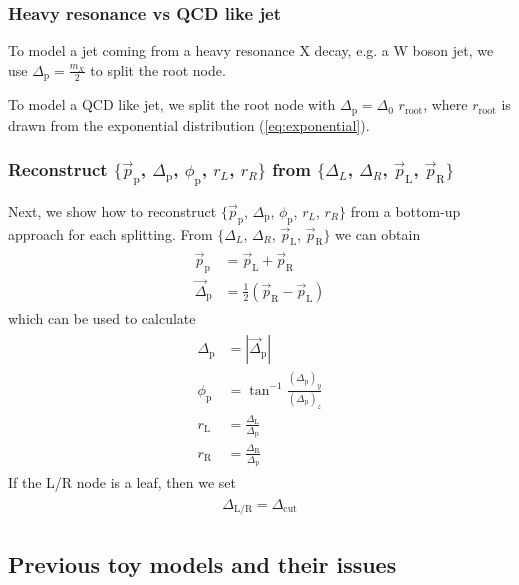 \documentclass[12pt]{article}
\newcommand{\bea}{\begin{eqnarray}\begin{aligned}}
\newcommand{\eea}{\end{aligned}\end{eqnarray}}
\begin{document}
\subsubsection{Heavy resonance vs QCD like jet}\label{Heavy resonance vs QCD like jet}

To model a jet coming from a heavy resonance X decay, e.g. a W boson jet, we use $\Delta_{\text{p}} =  \frac{m_X}{2}$ to split the root node.

To model a QCD like jet, we split the root node with $\Delta_{\text{p}} = \Delta_0 \,\, r_{\text{root}}$, where $r_{\text{root}}$ is drawn from the exponential distribution (\ref{eq:exponential}).

\subsubsection{Reconstruct $\{\vec{p}_\text{p}$, $\Delta_{\text{p}}$, $\phi_{\text{p}}$, $r_L$, $r_R\}$ from  $\{\Delta_L$, $\Delta_R$, $\vec{p}_\text{L}$, $ \vec{p}_\text{R}\}$ }

Next, we show how to reconstruct $\{\vec{p}_\text{p}$, $\Delta_{\text{p}}$, $\phi_{\text{p}}$, $r_L$, $r_R\}$ from a bottom-up approach for each splitting. From  $\{\Delta_L$, $\Delta_R$, $\vec{p}_\text{L}$, $ \vec{p}_\text{R}\}$ we can obtain
\bea
\vec{p}_\text{p} &= \vec{p}_\text{L}+ \vec{p}_\text{R}\\
\vec{\Delta}_\text{p} &= \frac{1}{2} (\vec{p}_\text{R} - \vec{p}_\text{L})
\eea
which can be used to calculate
\bea
\Delta_\text{p} &= | \vec{ \Delta}_\text{p} |\\
\phi_{\text{p}} &=\tan^{-1}\frac{(\Delta_\text{p})_y}{(\Delta_\text{p})_z}\\
r_{\text{L}} &=\frac{\Delta_{\text{L}}}{\Delta_{\text{p}}}\\
r_{\text{R}} &=\frac{\Delta_{\text{R}}}{\Delta_{\text{p}}}
\eea
If the L/R node is a leaf, then we set
\bea
\Delta_{\text{L/R}}=\Delta_{\text{cut}}
\eea









\subsection{Previous toy models and their issues}
\end{document}
